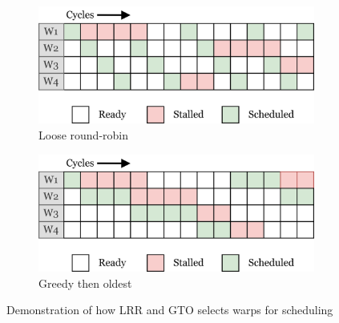 \begin{figure}
     \centering
     \begin{subfigure}[b]{0.45\textwidth}
         \centering
         \includegraphics[width=\textwidth]{figures/warp-scheduling-lrr.png}
         \caption{Loose round-robin}
         \label{fig:lrr}
     \end{subfigure}
     \hfill
     \begin{subfigure}[b]{0.45\textwidth}
         \centering
         \includegraphics[width=\textwidth]{figures/warp-scheduling-gto.png}
         \caption{Greedy then oldest}
         \label{fig:gto}
     \end{subfigure}
    \caption{Demonstration of how LRR and GTO selects warps for scheduling}
    \label{fig:lrr_gto}
\end{figure}

